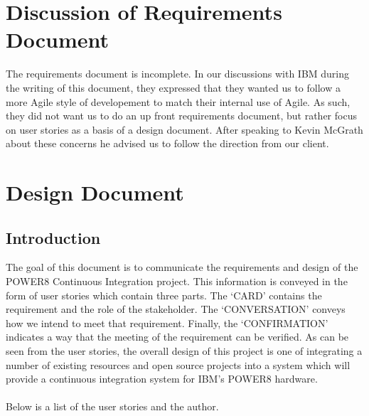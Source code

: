 \documentclass[10pt,letterpaper,onecolumn,draftclsnofoot]{IEEEtran}
\begin{document}
\section{Discussion of Requirements Document}
The requirements document is incomplete. In our discussions with IBM during the writing of this
document, they expressed that they wanted us to follow a more Agile style of developement to match
their internal use of Agile. As such, they did not want us to do an up front requirements document,
but rather focus on user stories as a basis of a design document. After speaking to Kevin McGrath
about these concerns he advised us to follow the direction from our client.

\clearpage
\section{Design Document}
\subsection{Introduction}
The goal of this document is to communicate the requirements and design of the POWER8 Continuous Integration project.
This information is conveyed in the form of user stories which contain three parts.
The `CARD' contains the requirement and the role of the stakeholder.
The `CONVERSATION' conveys how we intend to meet that requirement.
Finally, the `CONFIRMATION' indicates a way that the meeting of the requirement can be verified.
As can be seen from the user stories, the overall design of this project is one of integrating a number of existing resources and open source projects into a system which will provide a continuous integration system for IBM's POWER8 hardware.\\\\
Below is a list of the user stories and the author.\\
\end{document}
